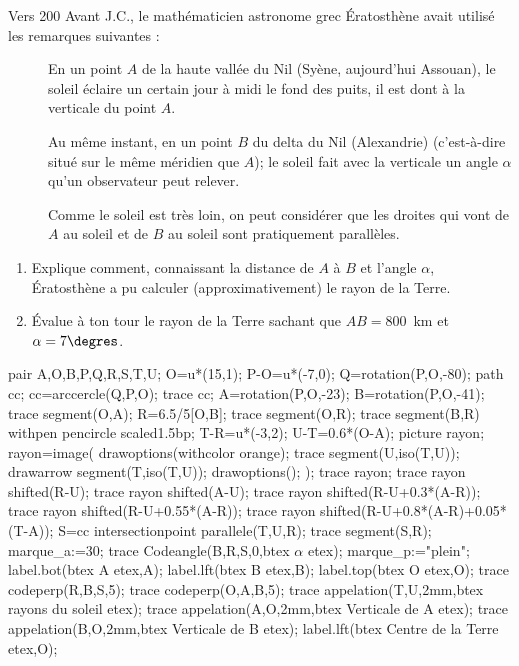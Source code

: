 \begin{exercice*}
  Vers 200 Avant J.C., le mathématicien astronome grec Ératosthène avait utilisé les remarques suivantes :
  \begin{description}
  \item[] En un point $A$ de la haute vallée du Nil (Syène, aujourd'hui Assouan), le soleil éclaire un certain jour à midi le fond des puits, il est dont à la verticale du point $A$.
  \item[] Au même instant, en un point $B$ du delta du Nil 
  (Alexandrie) (c'est-à-dire situé sur le même méridien que $A$); le soleil fait avec la verticale un angle $\alpha$ qu'un observateur peut relever.
  \item[] Comme le soleil est très loin, on peut considérer que les droites qui vont de $A$ au soleil et de $B$ au soleil sont pratiquement parallèles.
  \end{description}
  \begin{enumerate}
  \item Explique comment, connaissant la distance de $A$ à $B$ et l'angle $\alpha$, Ératosthène a pu calculer (approximativement) le rayon de la Terre.
  \item Évalue à ton tour le rayon de la Terre sachant que $AB=800$~km et $\alpha=7\degres$.
  \end{enumerate}
  \begin{minipage}{\linewidth}
    \begin{Geometrie}[CoinHD={(22u,10u)}]
      pair A,O,B,P,Q,R,S,T,U;
      O=u*(15,1);
      P-O=u*(-7,0);
      Q=rotation(P,O,-80);
      path cc;
      cc=arccercle(Q,P,O);
      trace cc;
      A=rotation(P,O,-23);
      B=rotation(P,O,-41);
      trace segment(O,A);
      R=6.5/5[O,B];
      trace segment(O,R);
      trace segment(B,R) withpen pencircle scaled1.5bp;
      T-R=u*(-3,2);
      U-T=0.6*(O-A);
      picture rayon;
      rayon=image(
        drawoptions(withcolor orange);
        trace segment(U,iso(T,U));
        drawarrow segment(T,iso(T,U));
        drawoptions();
        );
      trace rayon;
      trace rayon shifted(R-U);
      trace rayon shifted(A-U);
      trace rayon shifted(R-U+0.3*(A-R));
      trace rayon shifted(R-U+0.55*(A-R));
      trace rayon shifted(R-U+0.8*(A-R)+0.05*(T-A));
      S=cc intersectionpoint parallele(T,U,R);
      trace segment(S,R);
      marque_a:=30;
      trace Codeangle(B,R,S,0,btex $\alpha$ etex);
      marque_p:="plein";
      label.bot(btex A etex,A);
      label.lft(btex B etex,B);
      label.top(btex O etex,O);
      trace codeperp(R,B,S,5);
      trace codeperp(O,A,B,5);
      trace appelation(T,U,2mm,btex rayons du soleil etex);
      trace appelation(A,O,2mm,btex Verticale de A etex);
      trace appelation(B,O,2mm,btex Verticale de B etex);
      label.lft(btex Centre de la Terre etex,O);
    \end{Geometrie}
    \vspace*{10mm}
  \end{minipage}
\end{exercice*}

